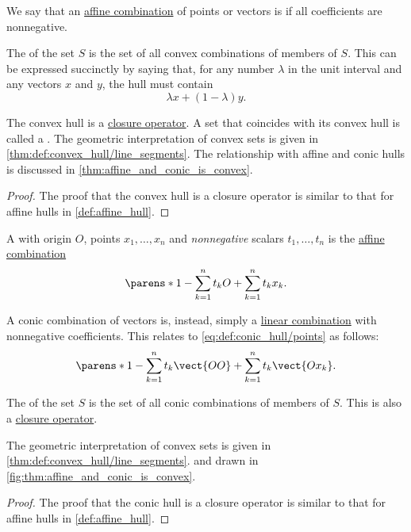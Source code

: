 \begin{definition}\label{def:convex_hull}\mimprovised
  We say that an \hyperref[def:affine_combinations]{affine combination} of points or vectors is  if all coefficients are nonnegative.

  The  of the set \( S \) is the set of all convex combinations of members of \( S \). This can be expressed succinctly by saying that, for any number \( \lambda \) in the unit interval and any vectors \( x \) and \( y \), the hull must contain
  \begin{equation}\label{eq:def:convex_hull/combination}
    \lambda x + (1 - \lambda) y.
  \end{equation}

  The convex hull is a \hyperref[def:abstract_closure_operator]{closure operator}. A set that coincides with its convex hull is called a . The geometric interpretation of convex sets is given in \cref{thm:def:convex_hull/line_segments}. The relationship with affine and conic hulls is discussed in \cref{thm:affine_and_conic_is_convex}.
\end{definition}
\begin{proof}
  The proof that the convex hull is a closure operator is similar to that for affine hulls in \cref{def:affine_hull}.
\end{proof}

\begin{definition}\label{def:convex_set}
\end{definition}

\begin{definition}\label{def:conic_hull}\mimprovised
  A  with origin \( O \), points \( x_1, \ldots, x_n \) and \emph{nonnegative} scalars \( t_1, \ldots, t_n \) is the \hyperref[def:affine_combinations]{affine combination}
  \begin{equation}\label{eq:def:conic_hull/points}
    \parens*{ 1 - \sum_{k=1}^n t_k } O + \sum_{k=1}^n t_k x_k.
  \end{equation}

  A conic combination of vectors is, instead, simply a \hyperref[def:linear_combination]{linear combination} with nonnegative coefficients. This relates to \eqref{eq:def:conic_hull/points} as follows:
  \begin{equation*}
    \parens*{ 1 - \sum_{k=1}^n t_k } \vect{OO} + \sum_{k=1}^n t_k \vect{O x_k}.
  \end{equation*}

  The  of the set \( S \) is the set of all conic combinations of members of \( S \). This is also a \hyperref[def:abstract_closure_operator]{closure operator}.

  The geometric interpretation of convex sets is given in \cref{thm:def:convex_hull/line_segments}. and drawn in \cref{fig:thm:affine_and_conic_is_convex}.
\end{definition}
\begin{proof}
  The proof that the conic hull is a closure operator is similar to that for affine hulls in \cref{def:affine_hull}.
\end{proof}

